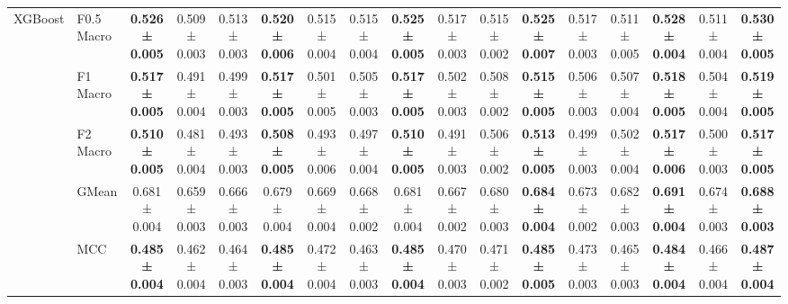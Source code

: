 \begin{table}[H]
{\begin{tabular}{llccccccccccccccc}
\cline{1-17}
\multirow[t]{5}{*}{XGBoost} & F0.5 Macro & \textbf{0.526 ± 0.005} & 0.509 ± 0.003 & 0.513 ± 0.003 & \textbf{0.520 ± 0.006} & 0.515 ± 0.004 & 0.515 ± 0.004 & \textbf{0.525 ± 0.005} & 0.517 ± 0.003 & 0.515 ± 0.002 & \textbf{0.525 ± 0.007} & 0.517 ± 0.003 & 0.511 ± 0.005 & \textbf{0.528 ± 0.004} & 0.511 ± 0.004 & \textbf{0.530 ± 0.005} \\
 & F1 Macro & \textbf{0.517 ± 0.005} & 0.491 ± 0.004 & 0.499 ± 0.003 & \textbf{0.517 ± 0.005} & 0.501 ± 0.005 & 0.505 ± 0.003 & \textbf{0.517 ± 0.005} & 0.502 ± 0.003 & 0.508 ± 0.002 & \textbf{0.515 ± 0.005} & 0.506 ± 0.003 & 0.507 ± 0.004 & \textbf{0.518 ± 0.005} & 0.504 ± 0.004 & \textbf{0.519 ± 0.005} \\
 & F2 Macro & \textbf{0.510 ± 0.005} & 0.481 ± 0.004 & 0.493 ± 0.003 & \textbf{0.508 ± 0.005} & 0.493 ± 0.006 & 0.497 ± 0.004 & \textbf{0.510 ± 0.005} & 0.491 ± 0.003 & 0.506 ± 0.002 & \textbf{0.513 ± 0.005} & 0.499 ± 0.003 & 0.502 ± 0.004 & \textbf{0.517 ± 0.006} & 0.500 ± 0.003 & \textbf{0.517 ± 0.005} \\
 & GMean & 0.681 ± 0.004 & 0.659 ± 0.003 & 0.666 ± 0.003 & 0.679 ± 0.004 & 0.669 ± 0.004 & 0.668 ± 0.002 & 0.681 ± 0.004 & 0.667 ± 0.002 & 0.680 ± 0.003 & \textbf{0.684 ± 0.004} & 0.673 ± 0.002 & 0.682 ± 0.003 & \textbf{0.691 ± 0.004} & 0.674 ± 0.003 & \textbf{0.688 ± 0.003} \\
 & MCC & \textbf{0.485 ± 0.004} & 0.462 ± 0.004 & 0.464 ± 0.003 & \textbf{0.485 ± 0.004} & 0.472 ± 0.004 & 0.463 ± 0.003 & \textbf{0.485 ± 0.004} & 0.470 ± 0.003 & 0.471 ± 0.002 & \textbf{0.485 ± 0.005} & 0.473 ± 0.003 & 0.465 ± 0.003 & \textbf{0.484 ± 0.004} & 0.466 ± 0.004 & \textbf{0.487 ± 0.004} \\
\cline{1-17}
\bottomrule
\end{tabular}
    }
\end{table}
